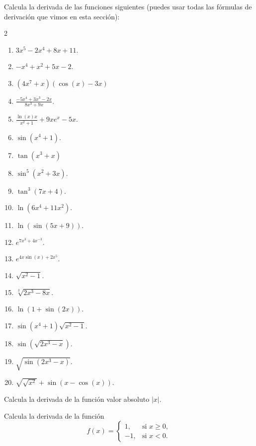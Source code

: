 \documentclass[12pt,a4paper]{book}
\begin{document}
    \begin{ejercicio}\label{ej:234}
        Calcula la derivada de las funciones siguientes (puedes usar
        todas las fórmulas de derivación que vimos en esta sección):
        \begin{multicols}{2}
        \begin{enumerate}[nosep]
            \item $3x^{5}-2x^{4}+8x+11$.
            \item $-x^{4}+x^{2}+5x-2$.
            \item $\left(4x^{7}+x\right)(\cos(x)-3x)$
            \item $\frac{-5x^{4}+3x^{3}-2x}{8x^{3}+9x}$.
            \item $\frac{\ln(x)x}{x^{2}+1}+9xe^{x}-5x$.
            \item $\sin\left(x^{4}+1\right)$.
            \item $\tan\left(x^{3}+x\right)$
            \item $\sin^{5}\left(x^{2}+3x\right)$.
            \item $\tan^{3}(7x+4)$.
            \item $\ln\left(6x^{4}+11x^{2}\right)$.
            \item $\ln(\sin(5x+9))$.
            \item $e^{7x^{3}+4x^{-3}}$.
            \item $e^{4x\sin(x)+2x^{5}}$.
            \item[(n)] $\sqrt{x^{2}-1}$.
            \item[(ñ)] $\sqrt[3]{2x^{3}-8x}$.
            \item[(o)] $\ln(1+\sin(2x))$.
            \item[(p)] $\sin\left(x^{4}+1\right)\sqrt{x^{2}-1}$.
            \item[(q)] $\sin\left(\sqrt{2x^{3}-x}\right)$.
            \item[(r)] $\sqrt{\sin\left(2x^{3}-x\right)}$.
            \item[(s)] $\sqrt{\sqrt{x^{2}}}+\sin(x-\cos(x))$.
        \end{enumerate}
        \end{multicols}
    \end{ejercicio}

    \begin{ejercicio}\label{ej:235}
        Calcula la derivada de la función valor absoluto $|x|$.
    \end{ejercicio}

    \begin{ejercicio}\label{ej:236}
        Calcula la derivada de la función
        \begin{equation*}
            f(x)=\begin{cases}
                1, & \text{si }x\geq 0,\\
                -1, & \text{si }x<0.
            \end{cases}
        \end{equation*}
    \end{ejercicio}
\end{document}
